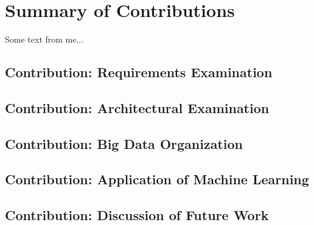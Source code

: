 

\chapter{Summary of Contributions}

\chapterintro*

Some text from me...\blindtext

\section{Contribution: Requirements Examination}
\blindtext

\section{Contribution: Architectural Examination}
\blindtext

\section{Contribution: Big Data Organization}
\blindtext

\section{Contribution: Application of Machine Learning}
\blindtext

\section{Contribution: Discussion of Future Work}
\blindtext